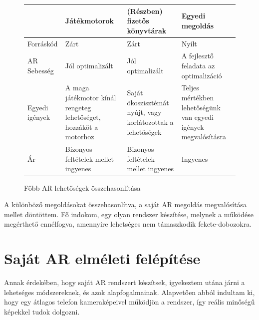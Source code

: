 \documentclass[12pt,a4paper,oneside]{report} %
\begin{document}
\begin{figure}[H]
	\centering
	
%	
%	

\begin{tabular}{s|p{3.5cm}|p{3.5cm}|p{3.5cm} }
	& Játékmotorok &(Részben) fizetős könyvtárak &  Egyedi megoldás \\
	\hline
	Forráskód & Zárt & Zárt & Nyílt \\
	AR Sebesség & Jól optimalizált & Jól optimalizált & A fejlesztő feladata az optimalizáció \\
	Egyedi igények   & A maga játékmotor kínál rengeteg lehetőséget, hozzáköt a motorhoz & Saját ökoszisztémát nyújt, vagy korlátozottak a lehetőségek   & Teljes mértékben lehetőségünk van egyedi igények megvalósításra  \\
	Ár & Bizonyos feltételek mellet ingyenes & Bizonyos feltételek mellet ingyenes & Ingyenes\\

	\end{tabular}
	\caption{Főbb AR lehetőségek összehasonlítása}
\end{figure}

A különböző megoldásokat összehasonlítva, a saját AR megoldás megvalósítása mellet döntöttem. Fő indokom, egy olyan rendszer készítése, melynek a működése megérthető ennélfogva, amennyire lehetséges nem támaszkodik fekete-dobozokra.

\section{Saját AR elméleti felépítése}
Annak érdekében, hogy saját AR rendszert készítsek, igyekeztem utána járni a lehetséges módszereknek, és azok alapfogalmainak.
Alapvetően abból indultam ki, hogy egy átlagos telefon kameraképeivel működjön a rendszer, így reális minőségű képekkel tudok dolgozni. 
\end{document}
